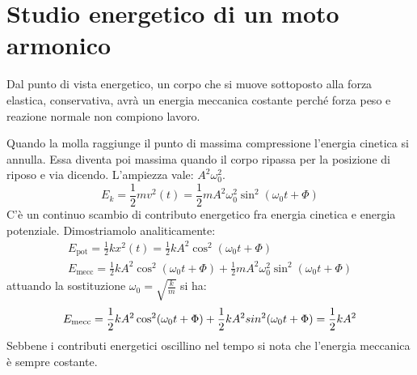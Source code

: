 \documentclass[10pt,a4paper]{book}
\begin{document}
\section{Studio energetico di un moto armonico}

Dal punto di vista energetico, un corpo che si muove sottoposto alla forza elastica, conservativa, avrà un energia meccanica costante perché forza peso e reazione normale non compiono lavoro.

Quando la molla raggiunge il punto di massima compressione l'energia cinetica si annulla. Essa diventa poi massima quando il corpo ripassa per la posizione di riposo e via dicendo.
L'ampiezza vale: $A^2\omega_0^2$.
\[
	E_k=\frac{1}{2}mv^2(t)=\frac{1}{2}mA^2\omega_0^2\sin^2(\omega_0 t+\Phi)
\]
C'è un continuo scambio di contributo energetico fra energia cinetica e energia potenziale. Dimostriamolo analiticamente:
\begin{gather*}
	E_{\text{pot}}=\frac{1}{2}kx^2(t)=\frac{1}{2}kA^2\cos^2(\omega_0 t+\Phi) \\
	E_{\text{mecc}}=\frac{1}{2}kA^2\cos^2(\omega_0 t+\Phi)+\frac{1}{2}mA^2\omega_0^2\sin^2(\omega_0 t+\Phi)
\end{gather*}
attuando la sostituzione $\omega_0=\sqrt{\frac{k}{m}}$ si ha:
\[
	E_{\text{mecc}}=\frac{1}{2}kA^2\cos^2(\omega_0 t+\Phi)+\frac{1}{2}kA^2\\sin^2(\omega_0 t+\Phi)=\frac{1}{2}kA^2
\]
Sebbene i contributi energetici oscillino nel tempo si nota che l'energia meccanica è sempre costante.
\end{document}
